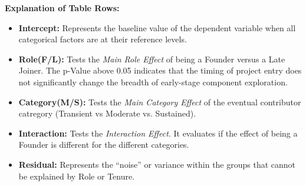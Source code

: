 \textbf{Explanation of Table Rows:}
\begin{itemize}
    \item \textbf{Intercept:} Represents the baseline value of the dependent variable when all categorical factors are at their reference levels.
    \item \textbf{Role(F/L):} Tests the \textit{Main Role Effect} of being a Founder versus a Late Joiner. The p-Value above 0.05 indicates that the timing of project entry does not significantly change the breadth of early-stage component exploration.
    \item \textbf{Category(M/S):} Tests the \textit{Main Category Effect} of the eventual contributor catregory (Transient vs Moderate vs. Sustained). 
    \item \textbf{Interaction:} Tests the \textit{Interaction Effect}. It evaluates if the effect of being a Founder is different for the different categories. 
    \item \textbf{Residual:} Represents the ``noise'' or variance within the groups that cannot be explained by Role or Tenure. 
\end{itemize}
